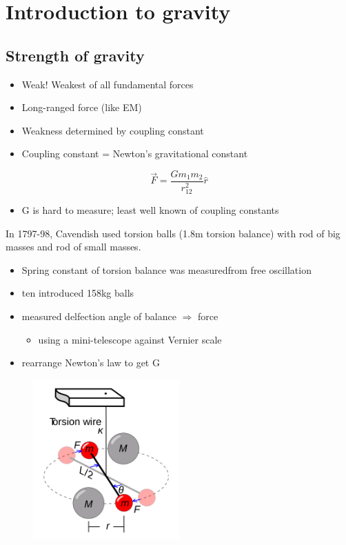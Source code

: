 \documentclass[a4paper]{article} %
\begin{document}
\begin{enumerate}
\end{enumerate}


\section{Introduction to gravity}
\subsection{Strength of gravity}
\begin{itemize}
\item Weak! Weakest of all fundamental forces
\item Long-ranged force (like EM)
\item Weakness determined by coupling constant
\item Coupling constant = Newton's gravitational constant
\end{itemize}
\begin{equation}
\vec{F}=\frac{Gm_1 m_2}{r_{12}^2}\hat{r}
\end{equation}
\begin{itemize}
\item G is hard to measure; least well known of coupling constants
\end{itemize}
In 1797-98, Cavendish used torsion balls (1.8m torsion balance) with rod of big masses and rod of small masses. 
\begin{itemize}
\item Spring constant of torsion balance was measuredfrom free oscillation
\item ten introduced 158kg balls
\item measured delfection angle of balance $\Rightarrow$ force
\begin{itemize}
\item using a mini-telescope against Vernier scale
\end{itemize}
\item rearrange Newton's law to get G
\end{itemize}

\begin{figure}[h]
\centering
\includegraphics[width=0.5\textwidth]{images/cavendish-torsion-balance.png}
\end{figure}
\end{document}
